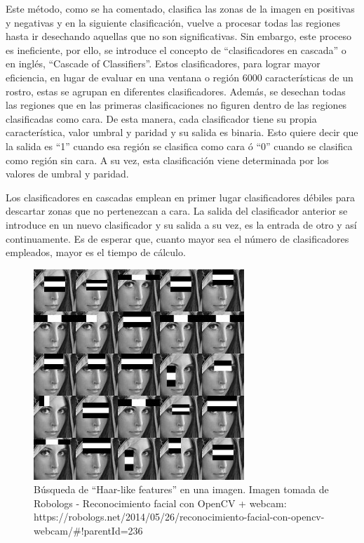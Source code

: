 Este método, como se ha comentado, clasifica las zonas de la imagen en positivas y negativas y en la siguiente clasificación, vuelve a procesar todas las regiones hasta ir desechando aquellas que no son significativas. Sin embargo, este proceso es ineficiente, por ello, se introduce el concepto de ``clasificadores en cascada'' o en inglés, ``Cascade of Classifiers''. Estos clasificadores, para lograr mayor eficiencia, en lugar de evaluar en una ventana o región 6000 características de un rostro, estas se agrupan en diferentes clasificadores. Además, se desechan todas las regiones que en las primeras clasificaciones no figuren dentro de las regiones clasificadas como cara. De esta manera, cada clasificador tiene su propia característica, valor umbral y paridad y su salida es binaria. Esto quiere decir que la salida es ``1'' cuando esa región se clasifica como cara ó ``0'' cuando se clasifica como región sin cara. A su vez, esta clasificación viene determinada por los valores de umbral y paridad.

Los clasificadores en cascadas emplean en primer lugar clasificadores débiles para descartar zonas que no pertenezcan a cara. La salida del clasificador anterior se introduce en un nuevo clasificador y su salida a su vez, es la entrada de otro y así continuamente. Es de esperar que, cuanto mayor sea el número de clasificadores empleados, mayor es el tiempo de cálculo.

\begin{figure}
\centering
\includegraphics[scale = 0.7]{capitulo_02/figuras_dir/haarcascade.jpg}
\caption{Búsqueda de ``Haar-like features'' en una imagen. Imagen tomada de Robologs - Reconocimiento facial con OpenCV + webcam: https://robologs.net/2014/05/26/reconocimiento-facial-con-opencv-webcam/\#!parentId=236}
\end{figure}

